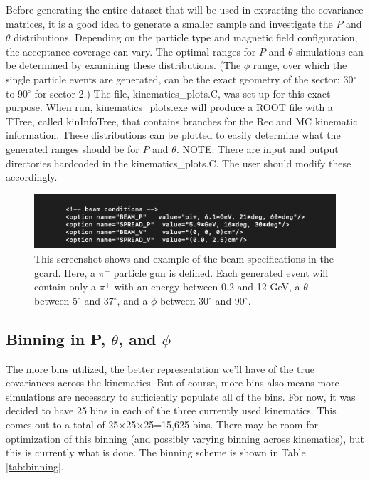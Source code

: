 \documentclass[showpacs,amsmath,amssymb,aps,prc,floatfix,showkeys,nofootinbib]{revtex4-1}
\begin{document}
Before generating the entire dataset that will be used in extracting the covariance matrices, it is a good idea to generate a smaller sample and investigate the $P$ and $\theta$ distributions. Depending on the particle type and magnetic field configuration, the acceptance coverage can vary. The optimal ranges for $P$ and $\theta$ simulations can be determined by examining these distributions. (The $\phi$ range, over which the single particle events are generated, can be the exact geometry of the sector: 30$^\circ$ to 90$^\circ$ for sector 2.) The file, kinematics\_plots.C, was set up for this exact purpose. When run, kinematics\_plots.exe will produce a ROOT file with a TTree, called kinInfoTree, that contains branches for the Rec and MC kinematic information. These distributions can be plotted to easily determine what the generated ranges should be for $P$ and $\theta$. NOTE: There are input and output directories hardcoded in the kinematics\_plots.C. The user should modify these accordingly.

\begin{figure} 
\centering
\includegraphics[width=.95\linewidth]{gcard_beam_modifications}
\caption{This screenshot shows and example of the beam specifications in the gcard. Here, a $\pi^+$ particle gun is defined. Each generated event will contain only a $\pi^+$ with an energy between 0.2 and 12 GeV, a $\theta$ between 5$^\circ$ and 37$^\circ$, and a $\phi$ between 30$^\circ$ and 90$^\circ$.}
\label{fig:gcard_beam}
\end{figure}


\subsection{\label{binning}Binning in P, $\theta$, and $\phi$} 
The more bins utilized, the better representation we'll have of the true covariances across the kinematics. But of course, more bins also means more simulations are necessary to sufficiently populate all of the bins. For now, it was decided to have 25 bins in each of the three currently used kinematics. This comes out to a total of 25$\times$25$\times$25=15,625 bins. There may be room for optimization of this binning (and possibly varying binning across kinematics), but this is currently what is done. The binning scheme is shown in Table \ref{tab:binning}. 
\end{document}
